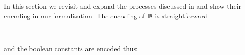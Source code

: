 \begin{code}[hide]
\>[0]\AgdaSpace{}%
\AgdaSpace{}%
\<%
\\
\>[0]\AgdaSpace{}%
\AgdaSpace{}%
\<%
\\
\>[0]\AgdaSpace{}%
\AgdaSpace{}%
\<%
\\
\>[0]\AgdaSpace{}%
\AgdaSpace{}%
\<%
\\
\>[0]\AgdaSpace{}%
\AgdaSpace{}%
\AgdaSpace{}%
\AgdaSpace{}%
\AgdaSymbol{(}\AgdaSymbol{)}\<%
\end{code}

In this section we revisit and expand the processes discussed in
 and show their encoding in our formalisation. The
encoding of $\mathbb{B}$ is straightforward

\begin{code}%
\>[0]\AgdaSpace{}%
\AgdaSymbol{:}\AgdaSpace{}%
\<%
\\
\>[0]\AgdaSpace{}%
\AgdaSymbol{=}\AgdaSpace{}%
\AgdaSpace{}%
\AgdaSpace{}%
\<%
\end{code}
and the boolean constants are encoded thus:
\begin{code}%
\>[0]\AgdaSpace{}%
\AgdaSymbol{:}\AgdaSpace{}%
\AgdaSpace{}%
\AgdaOperator{\AgdaFunction{[}}\AgdaSpace{}%
\AgdaSpace{}%
\AgdaOperator{\AgdaFunction{]}}\<%
\\
\>[0]\AgdaSpace{}%
\AgdaSymbol{=}\AgdaSpace{}%
\AgdaSpace{}%
\AgdaSymbol{(}\AgdaSpace{}%
\AgdaSpace{}%
\AgdaOperator{\AgdaInductiveConstructor{<}}\AgdaSpace{}%
\AgdaSpace{}%
\AgdaSpace{}%
\AgdaSpace{}%
\AgdaSymbol{(}\AgdaSpace{}%
\AgdaSymbol{))}\<%
\\
%
\\[\AgdaEmptyExtraSkip]%
\>[0]\AgdaSpace{}%
\AgdaSymbol{:}\AgdaSpace{}%
\AgdaSpace{}%
\AgdaOperator{\AgdaFunction{[}}\AgdaSpace{}%
\AgdaSpace{}%
\AgdaOperator{\AgdaFunction{]}}\<%
\\
\>[0]\AgdaSpace{}%
\AgdaSymbol{=}\AgdaSpace{}%
\AgdaSpace{}%
\AgdaSymbol{(}\AgdaSpace{}%
\AgdaSpace{}%
\AgdaOperator{\AgdaInductiveConstructor{<}}\AgdaSpace{}%
\AgdaSpace{}%
\AgdaSpace{}%
\AgdaSpace{}%
\AgdaSymbol{(}\AgdaSpace{}%
\AgdaSymbol{))}\<%
\end{code}

